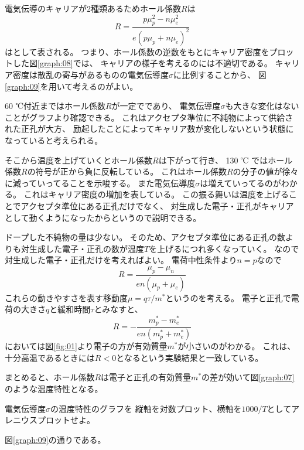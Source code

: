 \documentclass[11pt,dvipdfmx,a4paper]{jsarticle}
\numberwithin{equation}{section}
\begin{document}
電気伝導のキャリアが2種類あるためホール係数\(R\)は
\begin{equation}
	R = \frac{p\mu_p^2 - n\mu_e^2}{e(p\mu_p+n\mu_e)^2}
\end{equation}
はとして表される。
つまり、ホール係数の逆数をもとにキャリア密度をプロットした図\ref{graph:08}では、
キャリアの様子を考えるのには不適切である。
キャリア密度は散乱の寄与があるものの電気伝導度\(\sigma\)に比例することから、
図\ref{graph:09}を用いて考えるのがよい。

60 ℃付近まではホール係数\(R\)が一定でであり、
電気伝導度\(\sigma\)も大きな変化はないことがグラフより確認できる。
これはアクセプタ準位に不純物によって供給された正孔が大方、
励起したことによってキャリア数が変化しないという状態になっていると考えられる。

そこから温度を上げていくとホール係数\(R\)は下がって行き、
130 ℃ ではホール係数\(R\)の符号が正から負に反転している。
これはホール係数\(R\)の分子の値が徐々に減っていってることを示唆する。
また電気伝導度\(\sigma\)は増えていってるのがわかる。
これはキャリア密度の増加を表している。
この振る舞いは温度を上げることでアクセプタ準位にある正孔だけでなく、
対生成した電子・正孔がキャリアとして動くようになったからというので説明できる。

ドープした不純物の量は少ない。
そのため、アクセプタ準位にある正孔の数よりも対生成した電子・正孔の数が温度\(T\)を上げるにつれ多くなっていく。
なので対生成した電子・正孔だけを考えればよい。
電荷中性条件より\(n=p\)なので
\begin{equation}
	R = \frac{\mu_p-\mu_n}{en(\mu_p+\mu_e)}
\end{equation}
これらの動きやすさを表す移動度\(\mu=q\tau/m^*\)というのを考える。
電子と正孔で電荷の大きさ\(q\)と緩和時間\(\tau\)とみなすと、
\begin{equation}
	R = - \frac{m_p^*-m_e^*}{en(m_p^*+m_e^*)}
\end{equation}
においては図\ref{fig:01}より電子の方が有効質量\(m^*\)が小さいのがわかる。
これは、十分高温であるときには\(R<0\)となるという実験結果と一致している。

まとめると、ホール係数\(R\)は電子と正孔の有効質量\(m^*\)の差が効いて図\ref{graph:07}のような温度特性となる。
\\

\begin{tcolorbox}[title=課題5]
	電気伝導度\(\sigma\)の温度特性のグラフを
	縦軸を対数プロット、横軸を\(1000/T\)としてアレニウスプロットせよ。
\end{tcolorbox}
図\ref{graph:09}の通りである。\\
\end{document}
